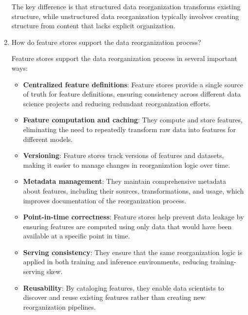 \documentclass[12pt]{article}
\begin{document}
\begin{enumerate}
\begin{tcolorbox}[colback=blue!5!white,colframe=blue!75!black,title={Solution}]
    The key difference is that structured data reorganization transforms existing structure, while unstructured data reorganization typically involves creating structure from content that lacks explicit organization.
    \end{tcolorbox}
    
    \item How do feature stores support the data reorganization process?
    
    \begin{tcolorbox}[colback=blue!5!white,colframe=blue!75!black,title={Solution}]
    Feature stores support the data reorganization process in several important ways:
    
    \begin{itemize}
        \item \textbf{Centralized feature definitions}: Feature stores provide a single source of truth for feature definitions, ensuring consistency across different data science projects and reducing redundant reorganization efforts.
        
        \item \textbf{Feature computation and caching}: They compute and store features, eliminating the need to repeatedly transform raw data into features for different models.
        
        \item \textbf{Versioning}: Feature stores track versions of features and datasets, making it easier to manage changes in reorganization logic over time.
        
        \item \textbf{Metadata management}: They maintain comprehensive metadata about features, including their sources, transformations, and usage, which improves documentation of the reorganization process.
        
        \item \textbf{Point-in-time correctness}: Feature stores help prevent data leakage by ensuring features are computed using only data that would have been available at a specific point in time.
        
        \item \textbf{Serving consistency}: They ensure that the same reorganization logic is applied in both training and inference environments, reducing training-serving skew.
        
        \item \textbf{Reusability}: By cataloging features, they enable data scientists to discover and reuse existing features rather than creating new reorganization pipelines.
        

\end{itemize}
\end{tcolorbox}
\end{enumerate}
\end{document}

